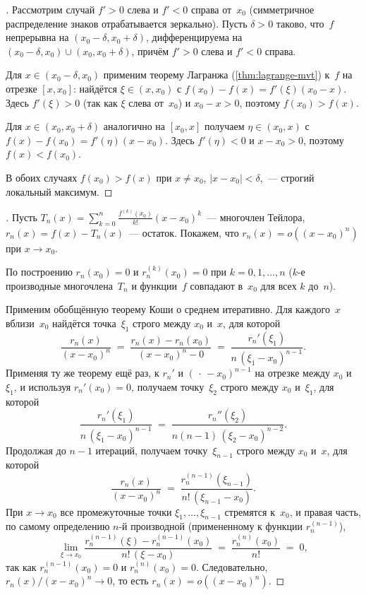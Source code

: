 \begin{proof}[]
Рассмотрим случай $f' > 0$ слева и $f' < 0$ справа от~$x_0$
(симметричное распределение знаков отрабатывается зеркально). Пусть
$\delta > 0$ таково, что~$f$ непрерывна на $(x_0 - \delta, x_0 + \delta)$,
дифференцируема на $(x_0 - \delta, x_0) \cup (x_0, x_0 + \delta)$, причём
$f' > 0$ слева и $f' < 0$ справа.

Для $x \in (x_0 - \delta, x_0)$ применим теорему Лагранжа
(\cref{thm:lagrange-mvt}) к~$f$ на отрезке $[x, x_0]$: найдётся
$\xi \in (x, x_0)$ с $f(x_0) - f(x) = f'(\xi)(x_0 - x)$. Здесь
$f'(\xi) > 0$ (так как $\xi$ слева от~$x_0$) и $x_0 - x > 0$, поэтому
$f(x_0) > f(x)$.

Для $x \in (x_0, x_0 + \delta)$ аналогично на $[x_0, x]$ получаем
$\eta \in (x_0, x)$ с $f(x) - f(x_0) = f'(\eta)(x - x_0)$. Здесь
$f'(\eta) < 0$ и $x - x_0 > 0$, поэтому $f(x) < f(x_0)$.

В обоих случаях $f(x_0) > f(x)$ при $x \neq x_0$, $|x - x_0| < \delta$,~---
строгий локальный максимум.
\end{proof}

\begin{proof}[]
Пусть $T_n(x) = \sum_{k=0}^{n} \frac{f^{(k)}(x_0)}{k!} (x - x_0)^k$~---
многочлен Тейлора, $r_n(x) = f(x) - T_n(x)$~--- остаток. Покажем, что
$r_n(x) = o((x - x_0)^n)$ при $x \to x_0$.

По построению $r_n(x_0) = 0$ и $r_n^{(k)}(x_0) = 0$ при
$k = 0, 1, \dots, n$ ($k$-е производные многочлена~$T_n$ и функции~$f$
совпадают в~$x_0$ для всех $k$ до~$n$).

Применим обобщённую теорему Коши о среднем итеративно. Для каждого~$x$
вблизи~$x_0$ найдётся точка~$\xi_1$ строго между $x_0$ и~$x$, для
которой
\[
  \frac{r_n(x)}{(x - x_0)^n}
  \;=\; \frac{r_n(x) - r_n(x_0)}{(x - x_0)^n - 0}
  \;=\; \frac{r_n'(\xi_1)}{n\,(\xi_1 - x_0)^{n-1}}.
\]
Применяя ту же теорему ещё раз, к $r_n'$ и $(\,\cdot\, - x_0)^{n-1}$
на отрезке между $x_0$ и~$\xi_1$, и используя $r_n'(x_0) = 0$,
получаем точку~$\xi_2$ строго между $x_0$ и~$\xi_1$, для которой
\[
  \frac{r_n'(\xi_1)}{n\,(\xi_1 - x_0)^{n-1}}
  \;=\; \frac{r_n''(\xi_2)}{n(n-1)\,(\xi_2 - x_0)^{n-2}}.
\]
Продолжая до $n - 1$ итераций, получаем точку~$\xi_{n-1}$ строго между
$x_0$ и~$x$, для которой
\[
  \frac{r_n(x)}{(x - x_0)^n}
  \;=\; \frac{r_n^{(n-1)}(\xi_{n-1})}{n!\,(\xi_{n-1} - x_0)}.
\]
При $x \to x_0$ все промежуточные точки $\xi_1, \dots, \xi_{n-1}$
стремятся к~$x_0$, и правая часть, по самому определению $n$-й
производной (примененному к функции $r_n^{(n-1)}$),
\[
  \lim_{\xi \to x_0} \frac{r_n^{(n-1)}(\xi) - r_n^{(n-1)}(x_0)}{n!\,(\xi - x_0)}
  \;=\; \frac{r_n^{(n)}(x_0)}{n!} \;=\; 0,
\]
так как $r_n^{(n-1)}(x_0) = 0$ и $r_n^{(n)}(x_0) = 0$.
Следовательно, $r_n(x)/(x - x_0)^n \to 0$, то есть
$r_n(x) = o((x - x_0)^n)$.
\end{proof}

